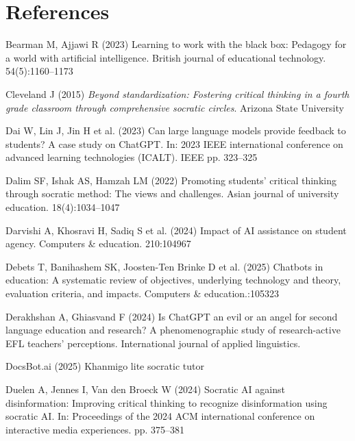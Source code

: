 \documentclass[
  12pt,
]{article}
\newlength{\cslhangindent}
\newenvironment{CSLReferences}[2] %
 {\begin{list}{}{%
  \setlength{\itemindent}{0pt}
  \setlength{\leftmargin}{0pt}
  \setlength{\parsep}{0pt}
  \ifodd #1
   \setlength{\leftmargin}{\cslhangindent}
   \setlength{\itemindent}{-1\cslhangindent}
  \fi
  \setlength{\itemsep}{#2\baselineskip}}}
 {\end{list}}
\begin{document}
\section*{References}\label{references}

\label{refs}
\begin{CSLReferences}{1}{0}
Bearman M, Ajjawi R (2023) Learning to work with the black box: Pedagogy for a world with artificial intelligence. British journal of educational technology. 54(5):1160--1173

Cleveland J (2015) \emph{Beyond standardization: Fostering critical thinking in a fourth grade classroom through comprehensive socratic circles}. Arizona State University

Dai W, Lin J, Jin H et al. (2023) Can large language models provide feedback to students? A case study on ChatGPT. In: 2023 IEEE international conference on advanced learning technologies (ICALT). IEEE pp. 323--325

Dalim SF, Ishak AS, Hamzah LM (2022) Promoting students' critical thinking through socratic method: The views and challenges. Asian journal of university education. 18(4):1034--1047

Darvishi A, Khosravi H, Sadiq S et al. (2024) Impact of AI assistance on student agency. Computers \& education. 210:104967

Debets T, Banihashem SK, Joosten-Ten Brinke D et al. (2025) Chatbots in education: A systematic review of objectives, underlying technology and theory, evaluation criteria, and impacts. Computers \& education.:105323

Derakhshan A, Ghiasvand F (2024) Is ChatGPT an evil or an angel for second language education and research? A phenomenographic study of research-active EFL teachers' perceptions. International journal of applied linguistics.

DocsBot.ai (2025) Khanmigo lite socratic tutor

Duelen A, Jennes I, Van den Broeck W (2024) Socratic AI against disinformation: Improving critical thinking to recognize disinformation using socratic AI. In: Proceedings of the 2024 ACM international conference on interactive media experiences. pp. 375--381


\end{CSLReferences}
\end{document}
